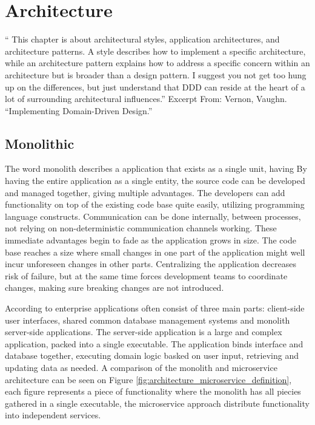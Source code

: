 \chapter{Architecture}
\label{ch:architecture}




“ This chapter is about architectural styles, application architectures, and architecture patterns. A style describes how to implement a specific architecture, while an architecture pattern explains how to address a specific concern within an architecture but is broader than a design pattern. I suggest you not get too hung up on the differences, but just understand that DDD can reside at the heart of a lot of surrounding architectural influences.”
Excerpt From: Vernon, Vaughn. “Implementing Domain-Driven Design.”


\section{Monolithic}
The word monolith describes a application that exists as a single unit, having  By having the entire application as a single entity, the source code can be developed and managed together, giving multiple advantages\cite[p.~68]{long2017cloud}. The developers can add functionality on top of the existing code base quite easily, utilizing programming language constructs. Communication can be done internally, between processes, not relying on non-deterministic communication channels working. These immediate advantages begin to fade as the application grows in size. The code base reaches a size where small changes in one part of the application might well incur unforeseen changes in other parts. Centralizing the application decreases risk of failure, but at the same time forces development teams to coordinate changes, making sure breaking changes are not introduced\cite[p.~68]{long2017cloud}. 

According to \citeauthor{fowler2014microservices} enterprise applications often consist of three main parts: client-side user interfaces, shared common database management systems and monolith server-side applications. The server-side application is a large and complex application, packed into a single executable. The application binds interface and database together, executing domain logic basked on user input, retrieving and updating data as needed. A comparison of the monolith and microservice architecture can be seen on Figure \ref{fig:architecture_microservice_definition}, each figure represents a piece of functionality where the monolith has all piecies gathered in a single executable, the microservice approach distribute functionality into independent services.

